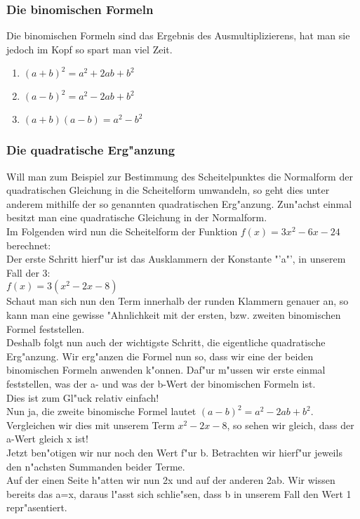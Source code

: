 \subsubsection{Die binomischen Formeln}
Die binomischen Formeln sind das Ergebnis des Ausmultiplizierens, hat man sie jedoch im Kopf so spart man viel Zeit.
\begin{enumerate}
\item $(a+b)^2=a^2+2ab+b^2$
\item $(a-b)^2=a^2-2ab+b^2$
\item $(a+b)(a-b)=a^2-b^2$
\end{enumerate}

\subsubsection{Die quadratische Erg"anzung}
Will man zum Beispiel zur Bestimmung des Scheitelpunktes die Normalform der quadratischen Gleichung in die Scheitelform umwandeln, so geht dies unter anderem mithilfe der so genannten quadratischen Erg"anzung. Zun"achst einmal besitzt man eine quadratische Gleichung in der Normalform.\\
Im Folgenden wird nun die Scheitelform der Funktion $f(x)=3x^2-6x-24$ berechnet:\\
Der erste Schritt hierf"ur ist das Ausklammern der Konstante "'a"', in unserem Fall der 3:\\
$f(x)=3(x^2-2x-8)$\\
Schaut man sich nun den Term innerhalb der runden Klammern genauer an, so kann man eine gewisse "Ahnlichkeit mit der ersten, bzw. zweiten binomischen Formel feststellen.\\
Deshalb folgt nun auch der wichtigste Schritt, die eigentliche quadratische Erg"anzung. Wir erg"anzen die Formel nun so, dass wir eine der beiden binomischen Formeln anwenden k"onnen. Daf"ur m"ussen wir erste einmal feststellen, was der a- und was der b-Wert der binomischen Formeln ist.\\
Dies ist zum Gl"uck relativ einfach!\\
Nun ja, die zweite binomische Formel lautet $(a-b)^2=a^2-2ab+b^2$. Vergleichen wir dies mit unserem Term $x^2-2x-8$, so sehen wir gleich, dass der a-Wert gleich x ist!\\
Jetzt ben"otigen wir nur noch den Wert f"ur b. Betrachten wir hierf"ur jeweils den n"achsten Summanden beider Terme.\\
Auf der einen Seite h"atten wir nun 2x und auf der anderen 2ab. Wir wissen bereits das a=x, daraus l"asst sich schlie"sen, dass b in unserem Fall den Wert 1 repr"asentiert.\\
